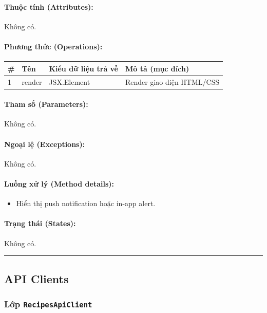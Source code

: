 \documentclass[12pt,a4paper]{article}
\begin{document}
\paragraph{Thuộc tính (Attributes):}
Không có.

\paragraph{Phương thức (Operations):}
\begin{longtable}{|p{0.6cm}|p{5.0cm}|p{2.8cm}|p{5.4cm}|}
\hline
\textbf{\#} & \textbf{Tên} & \textbf{Kiểu dữ liệu trả về} & \textbf{Mô tả (mục đích)} \\ \hline
\endhead
1 & render & JSX.Element & Render giao diện HTML/CSS \\ \hline
\end{longtable}

\paragraph{Tham số (Parameters):}
Không có.

\paragraph{Ngoại lệ (Exceptions):}
Không có.

\paragraph{Luồng xử lý (Method details):}
\begin{itemize}[leftmargin=*]
    \item Hiển thị push notification hoặc in-app alert.
\end{itemize}


\paragraph{Trạng thái (States):}
Không có.

\vskip 0.5cm
\noindent\rule{\textwidth}{0.5pt}
\vskip 0.5cm

\subsection{API Clients}


\subsubsection{Lớp \texttt{RecipesApiClient}}
\end{document}
